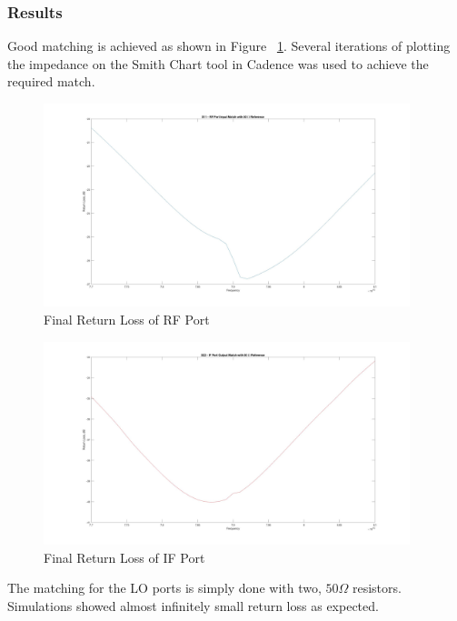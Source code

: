 \documentclass{article}                                                         %
\begin{document}
\subsubsection{Results}
Good matching is achieved as shown in Figure ~\ref{fig:matS11}. Several iterations of plotting the impedance on the Smith Chart tool
in Cadence was used to achieve the required match.
\begin{figure}[H]
  \centering
  \includegraphics[width=0.95\textwidth] {Plots/S11.jpg}
  \caption{Final Return Loss of RF Port}
    \label{fig:matS11}
\end{figure}
\begin{figure}[H]
  \centering
  \includegraphics[width=0.95\textwidth] {Plots/S22.jpg}
  \caption{Final Return Loss of IF Port}
    \label{fig:matS22}
\end{figure}

The matching for the LO ports is simply done with two, $50 \Omega$ resistors. Simulations
showed almost infinitely small return loss as expected.
\end{document}

